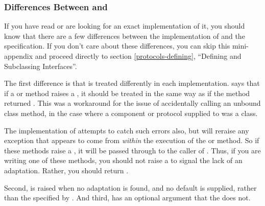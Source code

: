 \begin{verbatim%
}
\begin{verbatim%
}
\begin{seealso}
\end{seealso}



















\subsubsection{Differences Between  and }

If you have read  or are looking for an exact implementation of it,
you should know that there are a few differences between the 
implementation of  and the  specification.  If you
don't care about these differences, you can skip this mini-appendix and
proceed directly to section \ref{protocols-defining}, ``Defining and Subclassing
Interfaces''.

The first difference is that  is treated differently in
each implementation.   says that if a  or
 method raises a , it should be
treated in the same way as if the method returned .  This was
a workaround for the issue of accidentally calling an unbound class
method, in the case where a component or protocol supplied to
 was a class.

The  implementation of  attempts to catch
such errors also, but will reraise any exception that appears to come from
\emph{within} the execution of the  or
 method.  So if these methods raise a ,
it will be passed through to the caller of .  Thus, if you
are writing one of these methods, you should not raise a 
to signal the lack of an adaptation.  Rather, you should return .

Second,  is raised when no adaptation is
found, and no default is supplied, rather than the 
specified by .  And third,  has an optional
 argument that the   does not.


\end{verbatim%
}
\end{verbatim%
}
